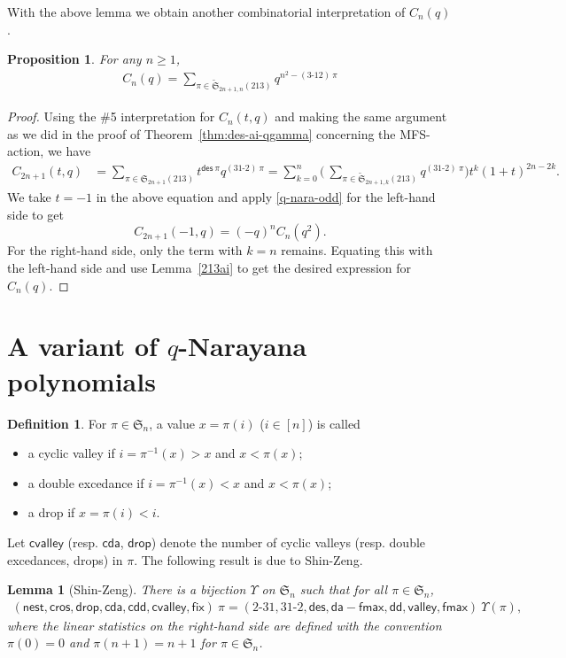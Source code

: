 \documentclass[12pt,reqno]{amsart}
\numberwithin{equation}{section}
\theoremstyle{plain}
\newtheorem{lemma}[theorem]{Lemma}
\newtheorem{proposition}[theorem]{Proposition}
\theoremstyle{definition}
\newtheorem{Def}[theorem]{Definition}
\def\S{\mathfrak{S}}
\def\da{\mathsf{da}}
\def\dd{\mathsf{dd}}
\def\des{\mathsf{des}}
\def\fix{\mathsf{fix}}
\def\fmax{\mathsf{fmax}}
\def\nest{\mathsf{nest}}
\def\cros{\mathsf{cros}}
\def\valley{\mathsf{valley}}
\def\cvalley{\mathsf{cvalley}}
\def\drop{\mathsf{drop}}
\def\cda{\mathsf{cda}}
\def\cdd{\mathsf{cdd}}
\def\cab{31\text{-}2}
\def\bca{2\text{-}31}
\begin{document}
With the above lemma we obtain another combinatorial interpretation of $C_{n}(q)$.

\begin{proposition}
For any $n\geq 1$,
\begin{align*}
C_{n}(q)=\sum_{\pi\in\widetilde{\S}_{2n+1, n}(213)}q^{n^2-(3\text{-}12)\:\pi}
\end{align*}
\end{proposition}

\begin{proof}
Using the \#5 interpretation for $C_n(t,q)$ and making the same argument as we did in the proof of Theorem~\ref{thm:des-ai-qgamma} concerning the MFS-action, we have
\begin{align*}
C_{2n+1}(t,q)&=\sum_{\pi\in\S_{2n+1}(213)}t^{\des\:\pi}q^{(31\text{-}2)\:\pi}
=\sum_{k=0}^{n}\biggl(\:\sum_{\pi\in\widetilde{\S}_{2n+1,k}(213)}q^{(31\text{-}2)\:\pi}\biggr)t^k(1+t)^{2n-2k}.
\end{align*}
We take $t=-1$ in the above equation and apply \eqref{q-nara-odd} for the left-hand side to get
$$
C_{2n+1}(-1,q)=(-q)^nC_{n}(q^2).
$$
For the right-hand side, only the term with $k=n$ remains. Equating this with the left-hand side and use Lemma~\ref{213ai} to get the desired expression for $C_n(q)$.
\end{proof}




\section{\texorpdfstring{A variant of $q$-Narayana polynomials}{}}\label{sec4: var-q-nara}

\begin{Def}\label{c-stat}
For $\pi\in\S_n$, a value $x=\pi(i)$ ($i\in[n]$) is called
\begin{itemize}
\item a cyclic valley if $i=\pi^{-1}(x)>x$ and $x<\pi(x)$;
\item a double excedance if $i=\pi^{-1}(x)<x$ and $x<\pi(x)$;
\item a drop if $x=\pi(i)<i$.
\end{itemize}
\end{Def}
Let $\cvalley$ (resp. $\cda$, $\drop$) denote the number of cyclic valleys (resp. double excedances, drops) in $\pi$. The following result is due to
Shin-Zeng\cite[Theorem~5]{SZ12}.
\begin{lemma}[Shin-Zeng]\label{SZ12_lem}
There is a bijection $\Upsilon$ on $\S_n$ such that for all $\pi\in \S_n$,
\begin{align*}
(\nest, \cros, \drop, \cda, \cdd, \cvalley, \fix)\:\pi=  (\bca, \cab, \des, \da-\fmax, \dd, \valley, \fmax)\:\Upsilon(\pi),
\end{align*}
where the linear statistics on the right-hand side are defined
with the convention $\pi(0)=0$ and $\pi(n+1)=n+1$ for $\pi\in \S_n$.
\end{lemma}
\end{document}
